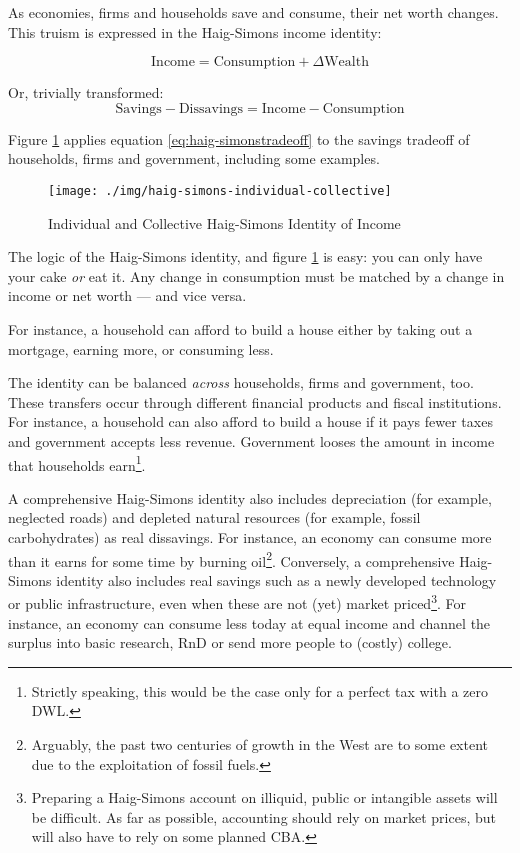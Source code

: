 As economies, firms and households save and consume, their net worth changes. This truism is expressed in the Haig-Simons income identity:

\begin{equation} \label{eq:haig-simons}
			\text{Income}=\text{Consumption}+\Delta\text{Wealth}
\end{equation}

Or, trivially transformed:
\begin{equation} \label{eq:haig-simonstradeoff}
			\text{Savings}-\text{Dissavings}=\text{Income}-\text{Consumption}
\end{equation}

Figure \ref{fig:haig-simons-individual-collective} applies equation \ref{eq:haig-simonstradeoff} to the savings tradeoff of households, firms and government, including some examples.

\begin{figure}[htbp]
	\centering
	\texttt{[image: ./img/haig-simons-individual-collective]}
	\caption{Individual and Collective Haig-Simons Identity of Income}
	\label{fig:haig-simons-individual-collective} %
\end{figure}

The logic of the Haig-Simons identity, and figure \ref{fig:haig-simons-individual-collective} is easy: you can only have your cake \emph{or} eat it. Any change in consumption must be matched by a change in income or net worth --- and vice versa.

For instance, a household can afford to build a house either by taking out a mortgage, earning more, or consuming less.

The identity can be balanced \emph{across} households, firms and government, too. These transfers occur through different financial products and fiscal institutions. For instance, a household can also afford to build a house if it pays fewer taxes and government accepts less revenue. Government looses the amount in income that households earn\footnote{
	Strictly speaking, this would be the case only for a perfect tax with a zero \gls{DWL}.}.

A comprehensive Haig-Simons identity also includes depreciation (for example, neglected roads) and depleted natural resources (for example, fossil carbohydrates) as real dissavings. For instance, an economy can consume more than it earns for some time by burning oil\footnote{
	Arguably, the past two centuries of growth in the West are to some extent due to the exploitation of fossil fuels.}. %
Conversely, a comprehensive Haig-Simons identity also includes real savings such as a newly developed technology or public infrastructure, even when these are not (yet) market priced\footnote{
	Preparing a Haig-Simons account on illiquid, public or intangible assets will be difficult. As far as possible, accounting should rely on market prices, but will also have to rely on  some planned \gls{CBA}.}.
For instance, an economy can consume less today at equal income and channel the surplus into basic research, \gls{RnD} or send more people to (costly) college.

